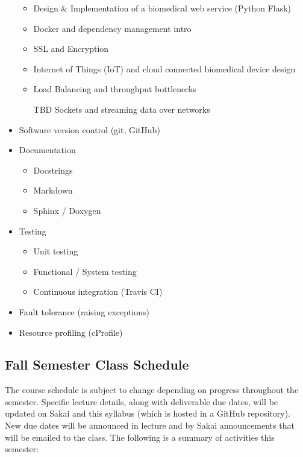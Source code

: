 \begin{multicols}{2}
\begin{itemize}
\begin{itemize}
        \item Design \& Implementation of a biomedical web service (Python Flask)
        \item Docker and dependency management intro
        \item SSL and Encryption
        \item Internet of Things (IoT) and cloud connected biomedical device design
        \item Load Balancing and throughput bottlenecks
        \item [TBD] Sockets and streaming data over networks
    \end{itemize}
    \item Software version control (git, GitHub)
    \item Documentation
    \begin{itemize}
        \item Docstrings
        \item Markdown
        \item Sphinx / Doxygen
    \end{itemize}
    \item Testing
    \begin{itemize}
        \item Unit testing
        \item Functional / System testing
        \item Continuous integration (Travis CI)
    \end{itemize}
    \item Fault tolerance (raising exceptions)
    \item Resource profiling (cProfile)
\end{itemize}
\end{multicols}

\subsection*{Fall Semester Class Schedule} 
The course schedule is subject to change depending on progress throughout the semester.
Specific lecture details, along with deliverable due dates,
will be updated on Sakai and this syllabus (which is hosted in a GitHub repository). New due dates will be announced in lecture
and by Sakai announcements that will be emailed to the class.  The following is
a summary of activities this semester:




